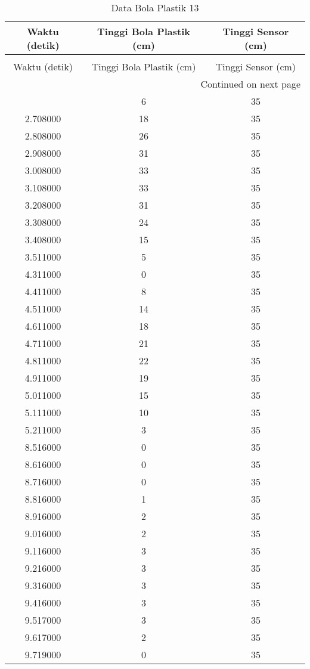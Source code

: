 \begin{longtable}[htbp]{|c|c|c|}
\caption{Data Bola Plastik 13} \\
\hline
Waktu (detik) & Tinggi Bola Plastik (cm) & Tinggi Sensor (cm) \\ \hline
\endfirsthead
\caption[]{Data Bola Plastik 13} \\
\hline
Waktu (detik) & Tinggi Bola Plastik (cm) & Tinggi Sensor (cm) \\ \hline
\endhead
\multicolumn{3}{r}{Continued on next page} \\
\endfoot
\endlastfoot
2.608000 & 6 & 35 \\ \hline
2.708000 & 18 & 35 \\ \hline
2.808000 & 26 & 35 \\ \hline
2.908000 & 31 & 35 \\ \hline
3.008000 & 33 & 35 \\ \hline
3.108000 & 33 & 35 \\ \hline
3.208000 & 31 & 35 \\ \hline
3.308000 & 24 & 35 \\ \hline
3.408000 & 15 & 35 \\ \hline
3.511000 & 5 & 35 \\ \hline
4.311000 & 0 & 35 \\ \hline
4.411000 & 8 & 35 \\ \hline
4.511000 & 14 & 35 \\ \hline
4.611000 & 18 & 35 \\ \hline
4.711000 & 21 & 35 \\ \hline
4.811000 & 22 & 35 \\ \hline
4.911000 & 19 & 35 \\ \hline
5.011000 & 15 & 35 \\ \hline
5.111000 & 10 & 35 \\ \hline
5.211000 & 3 & 35 \\ \hline
8.516000 & 0 & 35 \\ \hline
8.616000 & 0 & 35 \\ \hline
8.716000 & 0 & 35 \\ \hline
8.816000 & 1 & 35 \\ \hline
8.916000 & 2 & 35 \\ \hline
9.016000 & 2 & 35 \\ \hline
9.116000 & 3 & 35 \\ \hline
9.216000 & 3 & 35 \\ \hline
9.316000 & 3 & 35 \\ \hline
9.416000 & 3 & 35 \\ \hline
9.517000 & 3 & 35 \\ \hline
9.617000 & 2 & 35 \\ \hline
9.719000 & 0 & 35 \\ \hline
\end{longtable}
